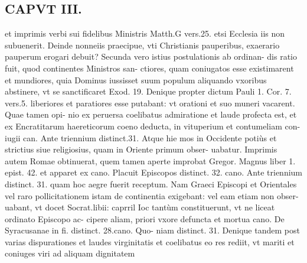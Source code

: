 \documentclass{article}
\begin{document}
\begin{pages}
\section*{CAPVT  III. }
\marginpar{[ p.115 ]}\pstart et imprimis verbi sui fidelibus Ministris Matth.G vers.25. etsi Ecclesia iis non subuenerit. Deinde nonneiis praecipue, vti Christianis pauperibus, exaerario pauperum erogari debuit?  \pend\pstart Secunda vero istius postulationis ab ordinan- dis ratio fuit, quod continentes Ministros san- ctiores, quam coniugatos esse existimarent et mundiores, quia Dominus iussisset suum populum aliquando vxoribus abstinere, vt se sanctificaret Exod. 19. Denique propter dictum Pauli 1. Cor. 7. vers.5. liberiores et paratiores esse putabant: vt orationi et suo muneri vacarent. Quae tamen opi- nio ex peruersa coelibatus admiratione et laude profecta est, et ex Encratitarum haereticorum coeno deducta, in vituperium et contumeliam con- iugii can. Ante triennium distinct.31.  \pend\pstart Atque hie mos in Occidente potiùs et strictius siue religiosius, quam in Oriente primum obser- uabatur. Imprimis autem Romae obtinuerat, quem tamen aperte improbat Gregor. Magnus liber 1. epist. 42. et apparet ex cano. Placuit Episcopos distinct. 32. cano. Ante triennium distinct. 31. quam hoc aegre fuerit receptum. Nam Graeci Episcopi et Orientales vel raro pollicitationem istam de continentia exigebant: vel eam etiam non obser- uabant, vt docet Socrat.libii: caprril Ioc tantùm constituerunt, vt ne liceat ordinato Episcopo ac- cipere aliam, priori vxore defuncta et mortua cano. De Syracusanae in fi. distinct. 28.cano. Quo- niam distinct. 31.  \pend\pstart Denique tandem post varias dispurationes et laudes virginitatis et coelibatus eo res rediit, vt mariti et coniuges viri ad aliquam dignitatem  \pend

\end{pages}
\end{document}
